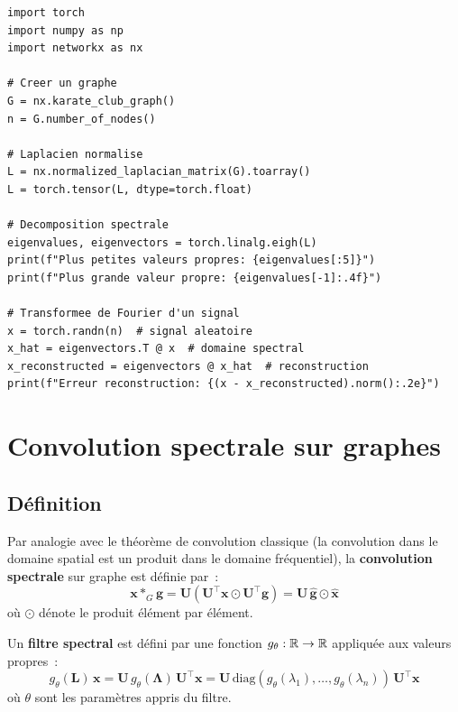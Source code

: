 \begin{codeblock}[title=\textbf{D\'ecomposition spectrale et transform\'ee de Fourier}]
\begin{verbatim}
import torch
import numpy as np
import networkx as nx

# Creer un graphe
G = nx.karate_club_graph()
n = G.number_of_nodes()

# Laplacien normalise
L = nx.normalized_laplacian_matrix(G).toarray()
L = torch.tensor(L, dtype=torch.float)

# Decomposition spectrale
eigenvalues, eigenvectors = torch.linalg.eigh(L)
print(f"Plus petites valeurs propres: {eigenvalues[:5]}")
print(f"Plus grande valeur propre: {eigenvalues[-1]:.4f}")

# Transformee de Fourier d'un signal
x = torch.randn(n)  # signal aleatoire
x_hat = eigenvectors.T @ x  # domaine spectral
x_reconstructed = eigenvectors @ x_hat  # reconstruction
print(f"Erreur reconstruction: {(x - x_reconstructed).norm():.2e}")
\end{verbatim}
\end{codeblock}

\section{Convolution spectrale sur graphes}

\subsection{D\'efinition}

\begin{definition}
Par analogie avec le th\'eor\`eme de convolution classique (la convolution
dans le domaine spatial est un produit dans le domaine fr\'equentiel), la
\textbf{convolution spectrale} sur graphe est d\'efinie par~:
\[
    \mathbf{x} *_G \mathbf{g} = \mathbf{U}\!\left(\mathbf{U}^\top \mathbf{x}
    \odot \mathbf{U}^\top \mathbf{g}\right)
    = \mathbf{U}\, \hat{\mathbf{g}} \odot \hat{\mathbf{x}}
\]
o\`u $\odot$ d\'enote le produit \'el\'ement par \'el\'ement.
\end{definition}

\begin{definition}
Un \textbf{filtre spectral} est d\'efini par une fonction
$g_\theta: \mathbb{R} \to \mathbb{R}$ appliqu\'ee aux valeurs propres~:
\[
    g_\theta(\mathbf{L})\, \mathbf{x} = \mathbf{U}\, g_\theta(\boldsymbol{\Lambda})\,
    \mathbf{U}^\top \mathbf{x}
    = \mathbf{U}\, \mathrm{diag}(g_\theta(\lambda_1), \ldots, g_\theta(\lambda_n))\,
    \mathbf{U}^\top \mathbf{x}
\]
o\`u $\theta$ sont les param\`etres appris du filtre.
\end{definition}

